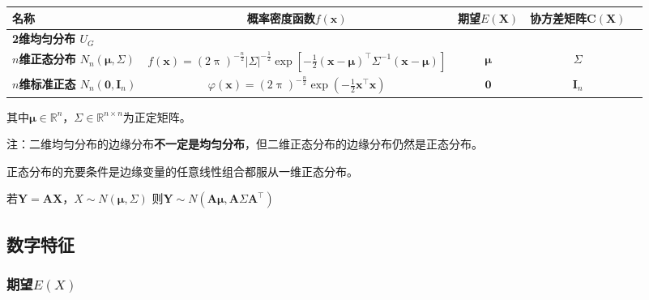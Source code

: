 \documentclass[UTF8,fontset=fandol,zihao=5]{ctexart}
\newcommand{\RR}{\mathbb{R}}
\newcommand{\vect}[1]{\bm{#1}}
\begin{document}
\begin{center}
  \begin{tabularx}{0.92\textwidth}{>{\bfseries}p{2.3cm}c c c c}
    \toprule
    \centering
    名称 & 概率密度函数$f(\vect x)$ & 期望$E(\vect X)$ & 协方差矩阵$\vect C(\vect X)$ \\
    \midrule
    \shortstack[c]{2维均匀分布\\$U_G$} & & &\\
    \shortstack[c]{$n$维正态分布\\$N_n(\vect\mu,\vect\varSigma)$} 
    & $ \displaystyle f(\vect x)=(2\uppi)^{-\frac{n}{2}}|\vect \varSigma|^{-\frac{1}{2}} \operatorname{exp}\left[-\frac{1}{2}(\vect x- \vect \mu)^{\top}\vect \varSigma^{-1}(\vect x-\vect\mu)\right] $ 
    & $\vect\mu$ & $\vect\varSigma$ \\
    \shortstack[c]{$n$维标准正态\\$N_n(\vect 0,\vect I_n)$} 
    & $ \displaystyle \varphi(\vect x)=(2\uppi)^{-\frac{n}{2}}\operatorname{exp}\left(-\frac{1}{2}\vect x^{\top}\vect x\right) $ 
    & $\vect 0$ & $\vect I_n$ \\
    \bottomrule
  \end{tabularx}
\end{center}

其中$\vect\mu\in\RR^n$，$\vect\varSigma\in\RR^{n\times n}$为正定矩阵。

注：二维均匀分布的边缘分布\textbf{不一定是均匀分布}，但二维正态分布的边缘分布仍然是正态分布。

正态分布的充要条件是边缘变量的任意线性组合都服从一维正态分布。

若$\vect Y = \vect A \vect X$，$X \sim N(\vect \mu,\vect \varSigma)$
则$\vect Y \sim N(\vect A \vect \mu,\vect A\vect \varSigma \vect A^{\top})$

\subsection{数字特征}

\subsubsection{期望$E(X)$}
\end{document}
